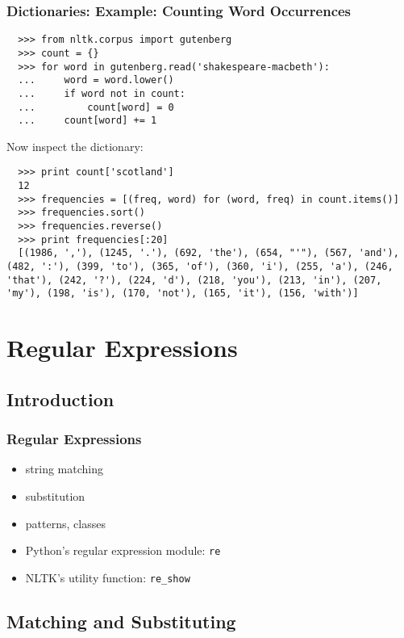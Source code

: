\documentclass{beamer}             %
\begin{document}
\begin{frame}[fragile]
\frametitle{Dictionaries: Example: Counting Word Occurrences}
\small

\begin{verbatim}
  >>> from nltk.corpus import gutenberg
  >>> count = {}
  >>> for word in gutenberg.read('shakespeare-macbeth'):
  ...     word = word.lower()
  ...     if word not in count:
  ...         count[word] = 0
  ...     count[word] += 1
\end{verbatim}

Now inspect the dictionary:

\begin{verbatim}
  >>> print count['scotland']
  12
  >>> frequencies = [(freq, word) for (word, freq) in count.items()]
  >>> frequencies.sort()
  >>> frequencies.reverse()
  >>> print frequencies[:20]
  [(1986, ','), (1245, '.'), (692, 'the'), (654, "'"), (567, 'and'), (482, ':'), (399, 'to'), (365, 'of'), (360, 'i'), (255, 'a'), (246, 'that'), (242, '?'), (224, 'd'), (218, 'you'), (213, 'in'), (207, 'my'), (198, 'is'), (170, 'not'), (165, 'it'), (156, 'with')]
\end{verbatim}
\end{frame}

\section{Regular Expressions}

\subsection{Introduction}

\begin{frame}
\frametitle{Regular Expressions}
\begin{itemize}
\item string matching
\item substitution
\item patterns, classes
\item Python's regular expression module: \texttt{re}
\item NLTK's utility function: \texttt{re\_show}
\end{itemize}
\end{frame}

\subsection{Matching and Substituting}
\end{document}
